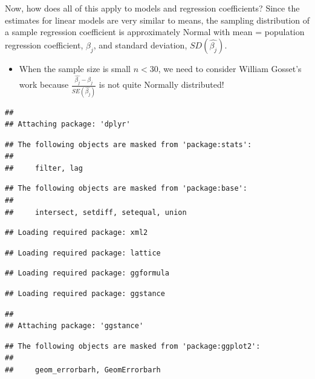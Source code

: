 \documentclass[
]{book}
\providecommand{\tightlist}{%
  \setlength{\itemsep}{0pt}\setlength{\parskip}{0pt}}
\begin{document}
Now, how does all of this apply to models and regression coefficients? Since the estimates for linear models are very similar to means, the sampling distribution of a sample regression coefficient is approximately Normal with mean = population regression coefficient, \(\beta_j\), and standard deviation, \(SD(\hat{\beta_j})\).

\begin{itemize}
\tightlist
\item
  When the sample size is small \(n<30\), we need to consider William Gosset's work because \(\frac{\hat{\beta_j} - \beta_j}{SE(\hat{\beta_j})}\) is not quite Normally distributed!
\end{itemize}

\begin{verbatim}
## 
## Attaching package: 'dplyr'
\end{verbatim}

\begin{verbatim}
## The following objects are masked from 'package:stats':
## 
##     filter, lag
\end{verbatim}

\begin{verbatim}
## The following objects are masked from 'package:base':
## 
##     intersect, setdiff, setequal, union
\end{verbatim}

\begin{verbatim}
## Loading required package: xml2
\end{verbatim}

\begin{verbatim}
## Loading required package: lattice
\end{verbatim}

\begin{verbatim}
## Loading required package: ggformula
\end{verbatim}

\begin{verbatim}
## Loading required package: ggstance
\end{verbatim}

\begin{verbatim}
## 
## Attaching package: 'ggstance'
\end{verbatim}

\begin{verbatim}
## The following objects are masked from 'package:ggplot2':
## 
##     geom_errorbarh, GeomErrorbarh
\end{verbatim}
\end{document}
